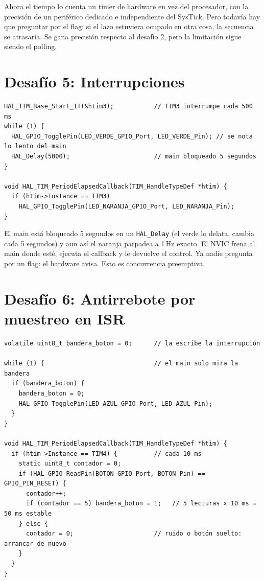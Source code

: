 \documentclass[11pt,a4paper]{article}
\begin{document}
Ahora el tiempo lo cuenta un timer de hardware en vez del procesador, con la precisión de un
periférico dedicado e independiente del SysTick. Pero todavía hay que preguntar por el flag: si el
lazo estuviera ocupado en otra cosa, la secuencia se atrasaría. Se gana precisión respecto al
desafío 2, pero la limitación sigue siendo el polling.

\section*{Desafío 5: Interrupciones}

\begin{lstlisting}
HAL_TIM_Base_Start_IT(&htim3);           // TIM3 interrumpe cada 500 ms
while (1) {
  HAL_GPIO_TogglePin(LED_VERDE_GPIO_Port, LED_VERDE_Pin); // se nota lo lento del main
  HAL_Delay(5000);                       // main bloqueado 5 segundos
}

void HAL_TIM_PeriodElapsedCallback(TIM_HandleTypeDef *htim) {
  if (htim->Instance == TIM3)
    HAL_GPIO_TogglePin(LED_NARANJA_GPIO_Port, LED_NARANJA_Pin);
}
\end{lstlisting}

El main está bloqueado 5 segundos en un \texttt{HAL\_Delay} (el verde lo delata, cambia cada 5
segundos) y aun así el naranja parpadea a 1\,Hz exacto. El NVIC frena al main donde esté, ejecuta
el callback y le devuelve el control. Ya nadie pregunta por un flag: el hardware avisa. Esto es
concurrencia preemptiva.

\section*{Desafío 6: Antirrebote por muestreo en ISR}

\begin{lstlisting}
volatile uint8_t bandera_boton = 0;      // la escribe la interrupción

while (1) {                              // el main solo mira la bandera
  if (bandera_boton) {
    bandera_boton = 0;
    HAL_GPIO_TogglePin(LED_AZUL_GPIO_Port, LED_AZUL_Pin);
  }
}

void HAL_TIM_PeriodElapsedCallback(TIM_HandleTypeDef *htim) {
  if (htim->Instance == TIM4) {          // cada 10 ms
    static uint8_t contador = 0;
    if (HAL_GPIO_ReadPin(BOTON_GPIO_Port, BOTON_Pin) == GPIO_PIN_RESET) {
      contador++;
      if (contador == 5) bandera_boton = 1;   // 5 lecturas x 10 ms = 50 ms estable
    } else {
      contador = 0;                      // ruido o botón suelto: arrancar de nuevo
    }
  }
}
\end{lstlisting}
\end{document}
